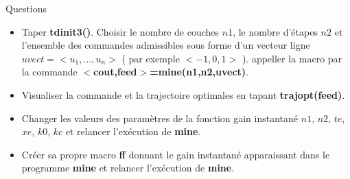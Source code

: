 \Mmine

\Mtrajopt

\Mshowcost

\Mff

\centerline{{\sc Questions}}

\begin{itemize}
\item Taper {\bf tdinit3()}. Choisir le nombre de couches $n1$, 
   le nombre d'\'etapes $n2$ et 
   l'ensemble des commandes admissibles sous forme d'un vecteur ligne 
   $uvect=<u_1,\ldots,u_n>$ ( par exemple $<-1,0,1>$ ). appeller la macro
	 par la commande {\bf $<$cout,feed$>$=mine(n1,n2,uvect)}.
\item Visualiser la commande et la trajectoire optimales en tapant 
	{\bf trajopt(feed)}. 
\item Changer les valeurs des param\`etres de la fonction gain instantan\'e 
   $n1$, $n2$, $te$, $xe$, $k0$,  $kc$ et relancer l'ex\'ecution de {\bf mine}.
\item Cr\'eer sa propre macro {\bf ff} donnant le gain instantan\'e apparaissant dans 
le programme {\bf mine} et relancer l'ex\'ecution de {\bf mine}.
\end{itemize}

 